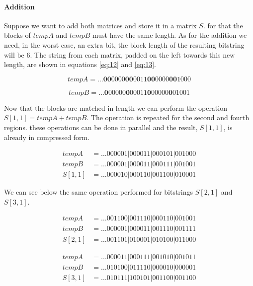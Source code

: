 \documentclass[10pt]{article}
\begin{document}
\paragraph{Addition}

Suppose we want to add both matrices and store it in a matrix $S$. for that the
blocks of $tempA$ and $tempB$ must have the same length. As for the addition we
need, in the worst case, an extra bit, the block length of the resulting
bitstring will be 6. The string from each matrix, padded on the left towards
this new length,  are shown in equations \ref{eq:12} and \ref{eq:13}.

\begin{equation}\label{eq:12}
tempA =  \ldots\textbf{00}0000\textbf{00}0011\textbf{00}0000\textbf{00}1000
\end{equation}

\begin{equation}\label{eq:13}
tempB =  \ldots\textbf{0}00000\textbf{0}00011\textbf{0}00000\textbf{0}01001
\end{equation}

Now that the blocks are matched in length we can perform the operation $S[1,1] =
tempA + tempB$. The operation is repeated for the second and fourth regions.
these operations can be done in parallel and the result, $S[1,1]$, is already
in compressed form.

\begin{align*}
 tempA&= \ldots000001|000011|000101|001000\\
 tempB&= \ldots000001|000011|000111|001001\\
 S[1,1]&=\ldots000010|000110|001100|010001
\end{align*}

We can see below the same operation performed for bitstrings $S[2,1]$ and
$S[3,1]$.

\begin{align*}
 tempA&= \ldots001100|001110|000110|001001\\
 tempB&= \ldots000001|000011|001110|001111\\
 S[2,1]&=\ldots001101|010001|010100|011000
\end{align*}

\begin{align*}
 tempA&= \ldots000011|000111|001010|001011 \\
 tempB&= \ldots010100|011110|000010|000001 \\
 S[3,1]&=\ldots010111|100101|001100|001100
\end{align*}
\end{document}
